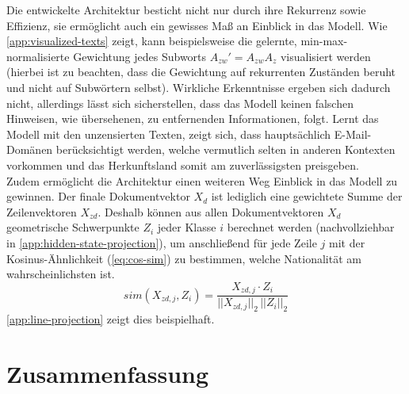\documentclass[bachelor,german]{info1thesis}
\begin{document}
Die entwickelte Architektur besticht nicht nur durch ihre Rekurrenz sowie Effizienz, sie ermöglicht auch ein gewisses Maß an Einblick in das Modell. Wie \autoref{app:visualized-texts} zeigt, kann beispielsweise die gelernte, min-max-normalisierte Gewichtung jedes Subworts $A_{zw}' = A_{zw}A_{z}$ visualisiert werden (hierbei ist zu beachten, dass die Gewichtung auf rekurrenten Zuständen beruht und nicht auf Subwörtern selbst). Wirkliche Erkenntnisse ergeben sich dadurch nicht, allerdings lässt sich sicherstellen, dass das Modell keinen falschen Hinweisen, wie übersehenen, zu entfernenden Informationen, folgt. Lernt das Modell mit den unzensierten Texten, zeigt sich, dass hauptsächlich E-Mail-Domänen berücksichtigt werden, welche vermutlich selten in anderen Kontexten vorkommen und das Herkunftsland somit am zuverlässigsten preisgeben. \\
%
%
%
%
Zudem ermöglicht die Architektur einen weiteren Weg Einblick in das Modell zu gewinnen. Der finale Dokumentvektor $X_d$ ist lediglich eine gewichtete Summe der Zeilenvektoren $X_{zd}$. Deshalb können aus allen Dokumentvektoren $X_d$ geometrische Schwerpunkte $Z_i$ jeder Klasse $i$ berechnet werden (nachvollziehbar in \autoref{app:hidden-state-projection}), um anschließend für jede Zeile $j$ mit der Kosinus-Ähnlichkeit (\autoref{eq:cos-sim}) zu bestimmen, welche Nationalität am wahrscheinlichsten ist.
\begin{equation}
sim(X_{zd,j}, Z_i) = \frac{X_{zd,j} \cdot Z_i}{||X_{zd,j}||_2\,||Z_i||_2} \label{eq:cos-sim}
\end{equation}
\autoref{app:line-projection} zeigt dies beispielhaft.

\chapter{Zusammenfassung}
\end{document}
